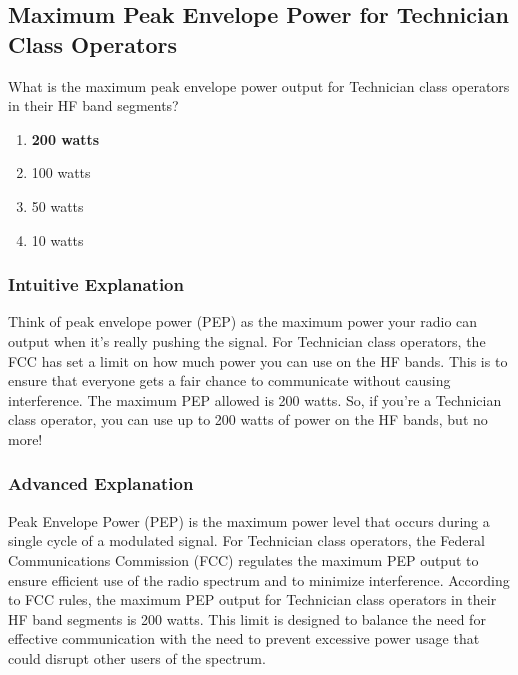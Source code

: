 \subsection{Maximum Peak Envelope Power for Technician Class Operators}
\label{T1B11}

\begin{tcolorbox}[colback=gray!10!white,colframe=black!75!black,title=T1B11]
What is the maximum peak envelope power output for Technician class operators in their HF band segments?
\begin{enumerate}[label=\Alph*,noitemsep]
    \item \textbf{200 watts}
    \item 100 watts
    \item 50 watts
    \item 10 watts
\end{enumerate}
\end{tcolorbox}

\subsubsection*{Intuitive Explanation}
Think of peak envelope power (PEP) as the maximum power your radio can output when it's really pushing the signal. For Technician class operators, the FCC has set a limit on how much power you can use on the HF bands. This is to ensure that everyone gets a fair chance to communicate without causing interference. The maximum PEP allowed is 200 watts. So, if you're a Technician class operator, you can use up to 200 watts of power on the HF bands, but no more!

\subsubsection*{Advanced Explanation}
Peak Envelope Power (PEP) is the maximum power level that occurs during a single cycle of a modulated signal. For Technician class operators, the Federal Communications Commission (FCC) regulates the maximum PEP output to ensure efficient use of the radio spectrum and to minimize interference. According to FCC rules, the maximum PEP output for Technician class operators in their HF band segments is 200 watts. This limit is designed to balance the need for effective communication with the need to prevent excessive power usage that could disrupt other users of the spectrum.